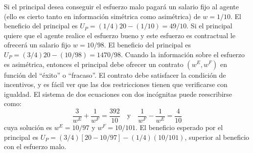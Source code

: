 Si el principal desea conseguir el esfuerzo malo pagará un salario fijo al agente (ello es cierto tanto en información simétrica como asimétrica) de $w=1/10$. El beneficio del principal es $U_P=(1/4)20-(1/10) = 49/10$. Si el principal quiere que el agente realice el esfuerzo bueno y este esfuerzo es contractual le ofrecerá un salario fijo $w=10/98$. El beneficio del principal es $U_P=(3/4)20-(10/98)=1470/98$. Cuando la información sobre el esfuerzo es asimétrica, entonces el principal debe ofrecer un contrato $(w^E,w^F)$ en función del ``éxito'' o ``fracaso''. El contrato debe satisfacer la condición de incentivos, y es fácil ver que las dos restricciones tienen que verificarse con igualdad. El sistema de dos ecuaciones con dos incógnitas puede reescribirse como:
	$$\frac{3}{w^E}+ \frac{1}{w^F}=\frac{392}{10} \quad \text{y} \quad \frac{1}{w^F} - \frac{1}{w^E}=\frac{4}{10}$$ 
cuya solución es $w^E=10/97$ y $w^F=10/101$. El beneficio esperado por el principal es $U_P = (3/4)[20-10/97]-(1/4)(10/101)$, superior al beneficio con el esfuerzo malo.